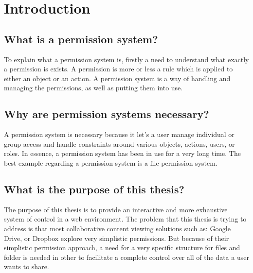 \chapter{Introduction}

\label{intro}


\section{What is a permission system?}
To explain what a permission system is, firstly a need to understand what exactly a permission is exists. A permission is more or less a rule which is applied to either an object or an action. A permission system is a way of handling and managing the permissions, as well as putting them into use.
\section{Why are permission systems necessary?}
A permission system is necessary because it let's a user manage individual or group access and handle constraints around various objects, actions, users, or roles. In essence, a permission system has been in use for a very long time. The best example regarding a permission system is a file permission system.
\section{What is the purpose of this thesis?}
The purpose of this thesis is to provide an interactive and more exhaustive system of control in a web environment. The problem that this thesis is trying to address is that most collaborative content viewing solutions such as: Google Drive, or Dropbox explore very simplistic permissions. But because of their simplistic permission approach, a need for a very specific structure for files and folder is needed in other to facilitate a complete control over all of the data a user wants to share. 

